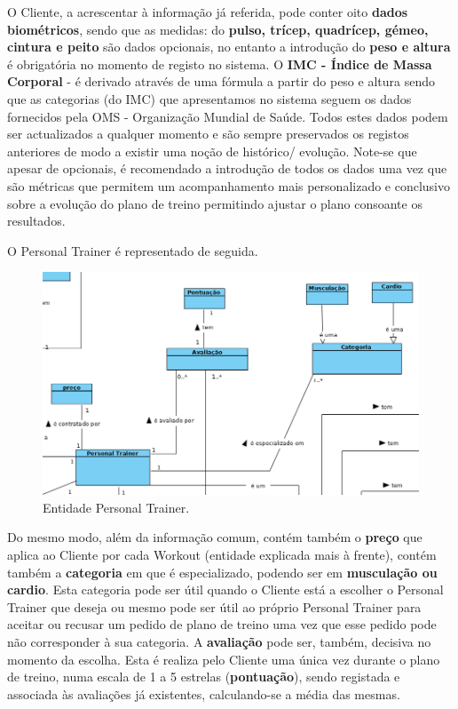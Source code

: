 \hspace{5mm} O Cliente, a acrescentar à informação já referida, pode conter oito \textbf{dados biométricos}, sendo que as medidas: do \textbf{pulso, trícep, quadrícep, gémeo, cintura e peito} são dados opcionais, no entanto a introdução do \textbf{peso e altura} é obrigatória no momento de registo no sistema. O \textbf{IMC - Índice de Massa Corporal} - é derivado através de uma fórmula a partir do peso e altura sendo que as categorias (do IMC) que apresentamos no sistema seguem os dados fornecidos pela OMS - Organização Mundial de Saúde. Todos estes dados podem ser actualizados a qualquer momento e são sempre preservados os registos anteriores de modo a existir uma noção de histórico/ evolução. Note-se que apesar de opcionais, é recomendado a introdução de todos os dados uma vez que são métricas que permitem um acompanhamento mais personalizado e conclusivo sobre a evolução do plano de treino permitindo ajustar o plano consoante os resultados.

\hspace{5mm} O Personal Trainer é representado de seguida.

\begin{figure}[H]
    \centering
    \includegraphics[scale=0.45]{images/modelação/pt.png}
    \caption{Entidade Personal Trainer.}
    \label{fig:interfaceperfilptbycliente}
\end{figure}

\hspace{5mm} Do mesmo modo, além da informação comum, contém também o \textbf{preço} que aplica ao Cliente por cada Workout (entidade explicada mais à frente), contém também a \textbf{categoria} em que é especializado, podendo ser em \textbf{musculação ou cardio}. Esta categoria pode ser útil quando o Cliente está a escolher o Personal Trainer que deseja ou mesmo pode ser útil ao próprio Personal Trainer para aceitar ou recusar um pedido de plano de treino uma vez que esse pedido pode não corresponder à sua categoria. A \textbf{avaliação} 
pode ser, também, decisiva no momento da escolha. Esta é realiza pelo Cliente uma única vez durante o plano de treino, numa escala de 1 a 5 estrelas (\textbf{pontuação}), sendo registada e associada às avaliações já existentes, calculando-se a média das mesmas.

